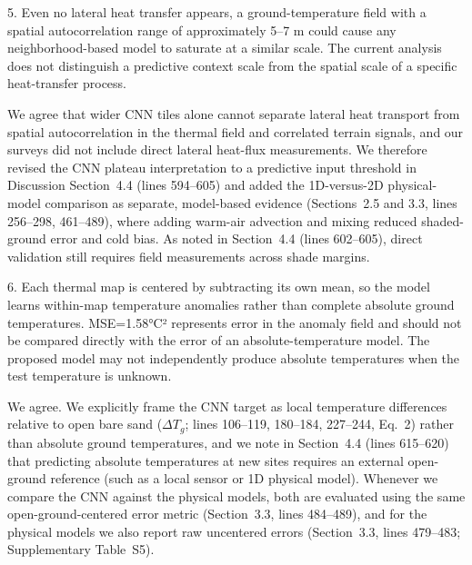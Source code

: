 \documentclass[12pt,english]{reviewresponse}
\begin{document}
\begin{revcomment}
5. Even no lateral heat transfer appears, a ground-temperature field with a spatial autocorrelation range of approximately 5–7 m could cause any neighborhood-based model to saturate at a similar scale. The current analysis does not distinguish a predictive context scale from the spatial scale of a specific heat-transfer process.
\end{revcomment}

\begin{revresponse}
We agree that wider CNN tiles alone cannot separate lateral heat transport from spatial autocorrelation in the thermal field and correlated terrain signals, and our surveys did not include direct lateral heat-flux measurements. We therefore revised the CNN plateau interpretation to a predictive input threshold in Discussion Section~4.4 (lines 594--605) and added the 1D-versus-2D physical-model comparison as separate, model-based evidence (Sections~2.5 and 3.3, lines 256--298, 461--489), where adding warm-air advection and mixing reduced shaded-ground error and cold bias. As noted in Section~4.4 (lines 602--605), direct validation still requires field measurements across shade margins.
\end{revresponse}

\begin{revcomment}
6. Each thermal map is centered by subtracting its own mean, so the model learns within-map temperature anomalies rather than complete absolute ground temperatures. MSE=1.58°C² represents error in the anomaly field and should not be compared directly with the error of an absolute-temperature model. The proposed model may not independently produce absolute temperatures when the test temperature is unknown.
\end{revcomment}

\begin{revresponse}
We agree. We explicitly frame the CNN target as local temperature differences relative to open bare sand ($\Delta T_g$; lines 106--119, 180--184, 227--244, Eq.~2) rather than absolute ground temperatures, and we note in Section~4.4 (lines 615--620) that predicting absolute temperatures at new sites requires an external open-ground reference (such as a local sensor or 1D physical model). Whenever we compare the CNN against the physical models, both are evaluated using the same open-ground-centered error metric (Section~3.3, lines 484--489), and for the physical models we also report raw uncentered errors (Section~3.3, lines 479--483; Supplementary Table~S5).
\end{revresponse}
\end{document}
